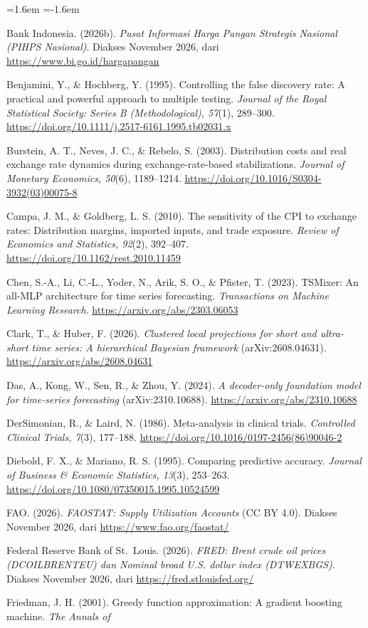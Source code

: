 \documentclass[11pt,a4paper]{article}
\newcommand{\refitem}[1]{\item\label{ref:#1}}
\begin{document}
\begin{list}{}{\leftmargin=1.6em \itemindent=-1.6em \itemsep=1.5pt \parsep=0pt \topsep=2pt}
\refitem{bipihps2026} Bank Indonesia. (2026b). \textit{Pusat Informasi Harga Pangan Strategis Nasional (PIHPS Nasional)}. Diakses
November 2026, dari \url{https://www.bi.go.id/hargapangan}
\refitem{bh1995} Benjamini, Y., \& Hochberg, Y. (1995). Controlling the false discovery rate: A practical and powerful approach to
multiple testing. \textit{Journal of the Royal Statistical Society: Series B (Methodological), 57}(1), 289–300.
\url{https://doi.org/10.1111/j.2517-6161.1995.tb02031.x}
\refitem{burstein2003} Burstein, A. T., Neves, J. C., \& Rebelo, S. (2003). Distribution costs and real exchange rate dynamics during
exchange-rate-based stabilizations. \textit{Journal of Monetary Economics, 50}(6), 1189–1214.
\url{https://doi.org/10.1016/S0304-3932(03)00075-8}
\refitem{campa2010} Campa, J. M., \& Goldberg, L. S. (2010). The sensitivity of the CPI to exchange rates: Distribution margins,
imported inputs, and trade exposure. \textit{Review of Economics and Statistics, 92}(2), 392–407.
\url{https://doi.org/10.1162/rest.2010.11459}
\refitem{chen2023} Chen, S.-A., Li, C.-L., Yoder, N., Arik, S. O., \& Pfister, T. (2023). TSMixer: An all-MLP architecture for time
series forecasting. \textit{Transactions on Machine Learning Research}. \url{https://arxiv.org/abs/2303.06053}
\refitem{clark2026} Clark, T., \& Huber, F. (2026). \textit{Clustered local projections for short and ultra-short time series: A
hierarchical Bayesian framework} (arXiv:2608.04631). \url{https://arxiv.org/abs/2608.04631}
\refitem{das2024} Das, A., Kong, W., Sen, R., \& Zhou, Y. (2024). \textit{A decoder-only foundation model for time-series
forecasting} (arXiv:2310.10688). \url{https://arxiv.org/abs/2310.10688}
\refitem{dl1986} DerSimonian, R., \& Laird, N. (1986). Meta-analysis in clinical trials. \textit{Controlled Clinical Trials, 7}(3),
177–188. \url{https://doi.org/10.1016/0197-2456(86)90046-2}
\refitem{dm1995} Diebold, F. X., \& Mariano, R. S. (1995). Comparing predictive accuracy. \textit{Journal of Business \& Economic
Statistics, 13}(3), 253–263. \url{https://doi.org/10.1080/07350015.1995.10524599}
\refitem{fao2026} FAO. (2026). \textit{FAOSTAT: Supply Utilization Accounts} (CC BY 4.0). Diakses November 2026, dari
\url{https://www.fao.org/faostat/}
\refitem{fred2026} Federal Reserve Bank of St.\ Louis. (2026). \textit{FRED: Brent crude oil prices (DCOILBRENTEU) dan Nominal broad
U.S. dollar index (DTWEXBGS)}. Diakses November 2026, dari \url{https://fred.stlouisfed.org/}
\refitem{friedman2001} Friedman, J. H. (2001). Greedy function approximation: A gradient boosting machine. \textit{The Annals of
}
\end{list}
\end{document}
